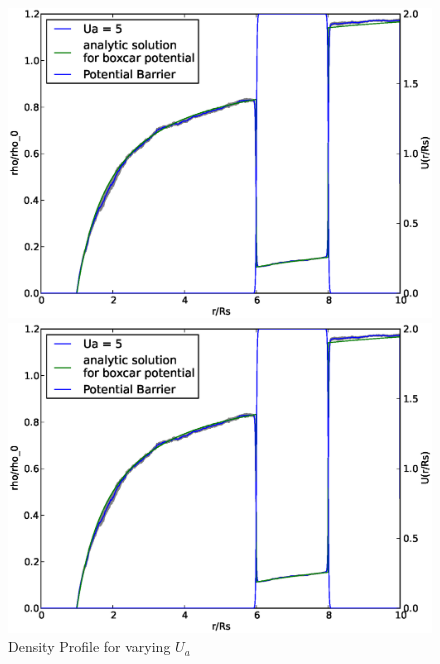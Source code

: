 \begin{figure}[H]
\begin{minipage}{.5 \textwidth}
    \includegraphics[width=.95 \textwidth, keepaspectratio]{plots/cp/ua/Ua5.eps}
\end{minipage}\begin{minipage}{.5 \textwidth}
    \includegraphics[width=.95 \textwidth, keepaspectratio]{plots/cp/ua/Ua5.eps}
\end{minipage}
 
    \caption{Density Profile for varying $U_a$}
    \label{fig:RhoUaCp}
\end{figure}


